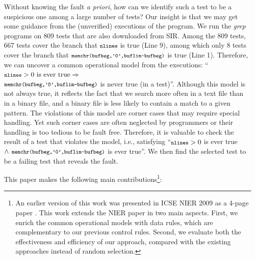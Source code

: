 \documentclass{sig-alternate}
\newcommand{\CodeIn}[1]{{\small\texttt{#1}}}
\begin{document}
Without knowing the fault \emph{a priori}, how can we identify such
a test to be a suspicious one among a large number of tests? Our
insight is that we may get some guidance from the (unverified)
executions of the program. We run the \emph{grep} programs on 809
tests that are also downloaded from SIR. Among the 809 tests, 667
tests cover the branch that $\CodeIn{nlines}$ is true (Line 9),
among which only 8 tests cover the branch that
$\CodeIn{memchr(bufbeg,'\\0',buflim-bufbeg)}$ is true (Line 1).
Therefore, we can uncover a common operational model from the
executions: ``$\CodeIn{nlines}>0 \textrm{ is ever true} \Rightarrow$
\\ $\CodeIn{memchr(bufbeg,'\\0',buflim-bufbeg)}$ is never true (in a
test)''. Although this model is not always true, it reflects the
fact that we search more often in a text file than in a binary file,
and a binary file is less likely to contain a match to a given
pattern. The violations of this model are corner cases that may
require special handling. Yet such corner cases are often neglected
by programmers or their handling is too tedious to be fault free.
Therefore, it is valuable to check the result of a test that
violates the model, i.e., satisfying ``$\CodeIn{nlines}>0$ is ever
true $\wedge \CodeIn{ memchr(bufbeg,'\\0',buflim-bufbeg)}$ is ever
true''. We then find the selected test to be a failing test that
reveals the fault.


This paper makes the following main contributions\footnote{An
earlier version of this work was presented in ICSE NIER 2009 as a
4-page paper \cite{Zheng09}. This work extends the NIER paper in two
main aspects. First, we enrich the common operational models with
data rules, which are complementary to our previous control rules.
Second, we evaluate both the effectiveness and efficiency of our
approach, compared with the existing approaches instead of random
selection.}:
\end{document}
